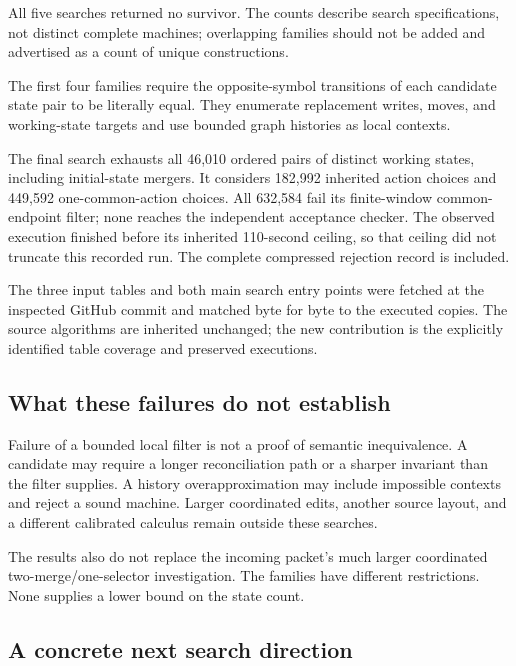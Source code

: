 \documentclass[11pt]{article}
\theoremstyle{remark}
\begin{document}
All five searches returned no survivor. The counts describe search
specifications, not distinct complete machines; overlapping families
should not be added and advertised as a count of unique constructions.

The first four families require the opposite-symbol transitions of each
candidate state pair to be literally equal. They enumerate replacement
writes, moves, and working-state targets and use bounded graph histories
as local contexts.

The final search exhausts all 46,010 ordered pairs of distinct working
states, including initial-state mergers. It considers 182,992 inherited
action choices and 449,592 one-common-action choices. All 632,584 fail its
finite-window common-endpoint filter; none reaches the independent
acceptance checker. The observed execution finished before its inherited
110-second ceiling, so that ceiling did not truncate this recorded run.
The complete compressed rejection record is included.

The three input tables and both main search entry points were fetched at
the inspected GitHub commit and matched byte for byte to the executed
copies. The source algorithms are inherited unchanged; the new contribution
is the explicitly identified table coverage and preserved executions.

\subsection{What these failures do not establish}

Failure of a bounded local filter is not a proof of semantic inequivalence.
A candidate may require a longer reconciliation path or a sharper invariant
than the filter supplies. A history overapproximation may include impossible
contexts and reject a sound machine. Larger coordinated edits, another
source layout, and a different calibrated calculus remain outside these
searches.

The results also do not replace the incoming packet's much larger
coordinated two-merge/one-selector investigation. The families have different
restrictions. None supplies a lower bound on the state count.

\subsection{A concrete next search direction}
\end{document}
